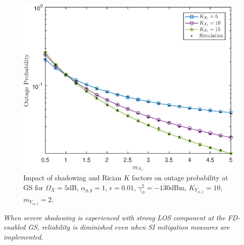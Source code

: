 \begin{figure} []
\centering
\vspace{0.2cm}
\includegraphics [width=0.45\columnwidth]{chap5_fig/gs_outage_mx1_vs_mysi1.eps} 
\caption{Impact of shadowing and Rician $K$ factors on outage probability at GS for $\Omega_X = 5$dB, $\alpha_{g,g}=1$, $\epsilon=0.01$, $\gamma_{\phi}^2=-130$dBm, $K_{Y_{si,1}}=10$, $m_{Y_{si,1}}=2$.}
\label{fig:HBD_UCS_Rician_Shadowed_gs_outage_mx1_vs_mysi1}
\end{figure}


\begin{observation}
\emph{\emph{When severe shadowing is experienced with strong LOS component at the FD-enabled GS, reliability is diminished even when SI mitigation measures are implemented.}
}\end{observation}

